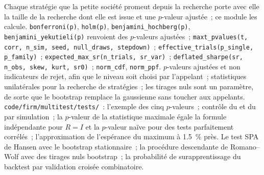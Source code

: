 \begin{build}
 Chaque stratégie que la petite société promeut depuis la recherche porte avec elle la taille de la recherche dont elle est issue et une
$p$-valeur ajustée~; ce module les calcule.
 \texttt{bonferroni(p)}, \texttt{holm(p)}, \texttt{benjamini\_hochberg(p)}, \texttt{benjamini\_yekutieli(p)} renvoient des
$p$-valeurs ajustées~; \texttt{maxt\_pvalues(t, corr, n\_sim, seed, null\_draws, stepdown)}~; \texttt{effective\_trials(p\_single,
p\_family)}~; \texttt{expected\_max\_sr(n\_trials, sr\_var)}~; \texttt{deflated\_sharpe(sr, n\_obs, skew, kurt, sr0)}~; \texttt{norm\_cdf},
\texttt{norm\_ppf}.
 $p$-valeurs ajustées et non indicateurs de rejet, afin que le niveau soit choisi par l'appelant~; statistiques unilatérales pour la
recherche de stratégies~; les tirages nuls sont un paramètre, de sorte que le bootstrap remplace la gaussienne sans toucher aux appelants.
 \texttt{code/firm/multitest/tests/}~: l'exemple des cinq $p$-valeurs~; contrôle du  et du  par simulation~; la
$p$-valeur de la statistique maximale égale la formule indépendante pour $R = I$ et la $p$-valeur naïve pour des tests parfaitement corrélés~;
l'approximation de l'espérance du maximum à 1.5~\% près.
 Le test SPA de Hansen avec le bootstrap stationnaire~; la procédure descendante de Romano--Wolf avec des tirages nuls bootstrap~; la
probabilité de surapprentissage du backtest par validation croisée combinatoire.
\end{build}

